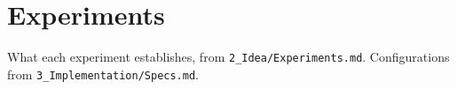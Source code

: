 \section{Experiments}
\label{sec:experiments}

What each experiment establishes, from \texttt{2\_Idea/Experiments.md}. Configurations
from \texttt{3\_Implementation/Specs.md}.
